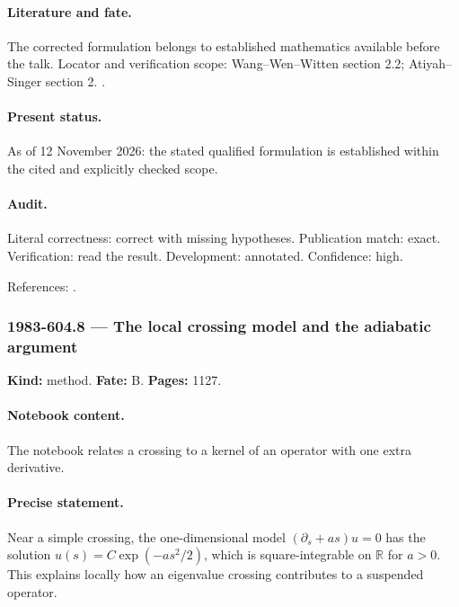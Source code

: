 \paragraph{Literature and fate.} The corrected formulation belongs to established mathematics available before the talk. Locator and verification scope: Wang--Wen--Witten section 2.2; Atiyah--Singer section 2. \cite{wangwenwitten2019new,atiyahsinger1971index5}.

\paragraph{Present status.} As of 12 November 2026: the stated qualified formulation is established within the cited and explicitly checked scope.

\paragraph{Audit.} Literal correctness: correct with missing hypotheses. Publication match: exact. Verification: read the result. Development: annotated. Confidence: high.

\noindent References: \citep{wangwenwitten2019new,atiyahsinger1971index5}.\par

\subsubsection{1983-604.8 --- The local crossing model and the adiabatic argument}

\label{item:1983-604.8}

\noindent\textbf{Kind:} method. \textbf{Fate:} B. \textbf{Pages:} 1127.\par

\paragraph{Notebook content.} The notebook relates a crossing to a kernel of an operator with one extra derivative.

\paragraph{Precise statement.} Near a simple crossing, the one-dimensional model \((\partial_s+as)u=0\) has the solution \(u(s)=C\exp(-as^2/2)\), which is square-integrable on \(\mathbb R\) for \(a>0\). This explains locally how an eigenvalue crossing contributes to a suspended operator.

